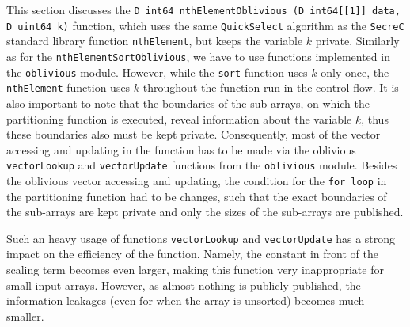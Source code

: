\documentclass[11pt]{article}
\newcommand{\ct}[1]{\texttt{#1}}
\newcommand{\SC}{\ct{SecreC}\xspace}
\begin{document}
This section discusses the \ct{D int64 nthElementOblivious (D int64[[1]] data, D uint64 k)} function, which uses the same \ct{QuickSelect} algorithm as the \SC standard library function \ct{nthElement}, but keeps the variable $k$ private. Similarly as for the \ct{nthElementSortOblivious}, we have to use functions implemented in the \ct{oblivious} module. However, while the \ct{sort} function uses $k$ only once, the \ct{nthElement} function uses $k$ throughout the function run in the control flow. It is also important to note that the boundaries of the sub-arrays, on which the partitioning function is executed, reveal information about the variable $k$, thus these boundaries also must be kept private. Consequently, most of the vector accessing and updating in the function has to be made via the oblivious \ct{vectorLookup} and \ct{vectorUpdate} functions from the \ct{oblivious} module. Besides the oblivious vector accessing and updating, the condition for the \ct{for loop} in the partitioning function had to be changes, such that the exact boundaries of the sub-arrays are kept private and only the sizes of the sub-arrays are published. 

Such an heavy usage of functions \ct{vectorLookup} and \ct{vectorUpdate} has a strong impact on the efficiency of the function. Namely, the constant in front of the scaling term becomes even larger, making this function very inappropriate for small input arrays. However, as almost nothing is publicly published, the information leakages (even for when the array is unsorted) becomes much smaller.  









% 
\end{document}
